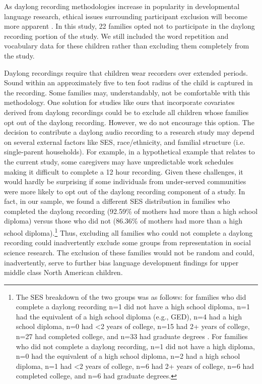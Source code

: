\documentclass[a4paper,man,natbib,donotrepeattitle, apacite]{apa6}
\begin{document}
As daylong recording methodologies increase in popularity in developmental language research, ethical issues surrounding participant exclusion will become more apparent \cite{casillasStepbystepGuideCollecting2019}. In this study, 22 families opted not to participate in the daylong recording portion of the study. We still included the word repetition and vocabulary data for these children rather than excluding them completely from the study. 

Daylong recordings require that children wear recorders over extended periods. Sound within an approximately five to ten foot radius of the child is captured in the recording. Some families may, understandably, not be comfortable with this methodology. One solution for studies like ours that incorporate covariates derived from daylong recordings could be to exclude all children whose families opt out of the daylong recording. However, we do not encourage this option. The decision to contribute a daylong audio recording to a research study may depend on several external factors like SES, race/ethnicity, and familial structure (i.e. single-parent households). For example, in a hypothetical example that relates to the current study, some caregivers may have unpredictable work schedules making it difficult to complete a 12 hour recording. Given these challenges, it would hardly be surprising if some individuals from under-served communities were more likely to opt out of the daylong recording component of a study. In fact, in our sample, we found a different SES distribution in families who completed the daylong recording (92.59\% of mothers had more than a high school diploma) versus those who did not (86.36\% of mothers had more than a high school diploma).\footnote{ The SES breakdown of the two groups was as follows: for families who did complete a daylong recording n=1 did not have a high school diploma, n=1 had the equivalent of a high school diploma (e.g., GED), n=4 had a high school diploma, n=0 had <2 years of college, n=15 had 2+ years of college, n=27 had completed college, and n=33 had graduate degrees . For families who did not complete a daylong recording, n=1 did not have a high diploma, n=0 had the equivalent of a high school diploma, n=2 had a high school diploma, n=1 had <2 years of college, n=6 had 2+ years of college, n=6 had completed college, and n=6 had graduate degrees.} Thus, excluding all families who could not complete a daylong recording could inadvertently exclude some groups from representation in social science research. The exclusion of these families would not be random and could, inadvertently, serve to further bias language development findings for upper middle class North American children. 
\end{document}
